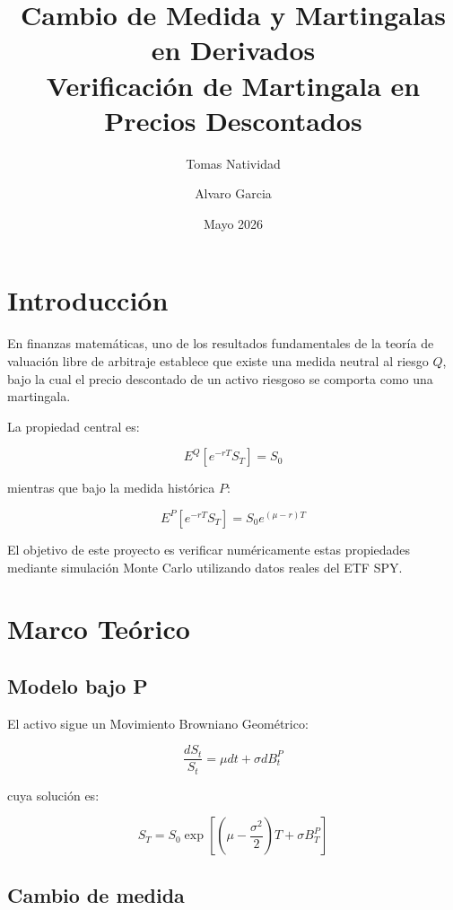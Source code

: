 \documentclass[12pt]{article}
\title{Cambio de Medida y Martingalas en Derivados\\
Verificación de Martingala en Precios Descontados}
\author{Tomas Natividad \and Alvaro Garcia}
\date{Mayo 2026}
\begin{document}
\maketitle

\section{Introducción}

En finanzas matemáticas, uno de los resultados fundamentales de la teoría de valuación libre de arbitraje establece que existe una medida neutral al riesgo $Q$, bajo la cual el precio descontado de un activo riesgoso se comporta como una martingala.

La propiedad central es:

\begin{equation}
E^Q[e^{-rT}S_T]=S_0
\end{equation}

mientras que bajo la medida histórica $P$:

\begin{equation}
E^P[e^{-rT}S_T]=S_0e^{(\mu-r)T}
\end{equation}

El objetivo de este proyecto es verificar numéricamente estas propiedades mediante simulación Monte Carlo utilizando datos reales del ETF SPY.

\section{Marco Teórico}

\subsection{Modelo bajo P}

El activo sigue un Movimiento Browniano Geométrico:

\begin{equation}
\frac{dS_t}{S_t}=\mu dt+\sigma dB_t^P
\end{equation}

cuya solución es:

\begin{equation}
S_T=S_0\exp\left[\left(\mu-\frac{\sigma^2}{2}\right)T+\sigma B_T^P\right]
\end{equation}

\subsection{Cambio de medida}
\end{document}

